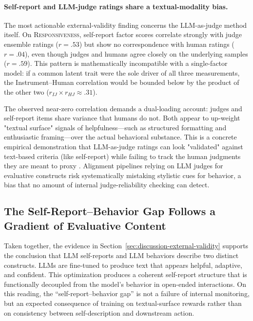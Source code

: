\documentclass[11pt]{article}
\newcommand{\factorname}[1]{\textsc{#1}}
\begin{document}
\paragraph{Self-report and LLM-judge ratings share a textual-modality bias.}
The most actionable external-validity finding concerns the LLM-as-judge method itself. On \factorname{Responsiveness}, self-report factor scores correlate strongly with judge ensemble ratings ($r = .53$) but show no correspondence with human ratings ($r = .04$), even though judges and humans agree closely on the underlying samples ($r = .59$). This pattern is mathematically incompatible with a single-factor model: if a common latent trait were the sole driver of all three measurements, the Instrument--Human correlation would be bounded below by the product of the other two ($r_{IJ} \times r_{HJ} \approx .31$). 

The observed near-zero correlation demands a dual-loading account: judges and self-report items share variance that humans do not. Both appear to up-weight "textual surface" signals of helpfulness---such as structured formatting and enthusiastic framing---over the actual behavioral substance. This is a concrete empirical demonstration that LLM-as-judge ratings can look "validated" against text-based criteria (like self-report) while failing to track the human judgments they are meant to proxy \citep{zheng2023judging}. Alignment pipelines relying on LLM judges for evaluative constructs risk systematically mistaking stylistic cues for behavior, a bias that no amount of internal judge-reliability checking can detect.

\subsection{The Self-Report--Behavior Gap Follows a Gradient of Evaluative Content}
\label{sec:discussion-self-insight}

Taken together, the evidence in Section~\ref{sec:discussion-external-validity} supports the conclusion that LLM self-reports and LLM behaviors describe two distinct constructs. LLMs are fine-tuned to produce text that appears helpful, adaptive, and confident. This optimization produces a coherent self-report structure that is functionally decoupled from the model's behavior in open-ended interactions. On this reading, the ``self-report--behavior gap'' is not a failure of internal monitoring, but an expected consequence of training on textual-surface rewards rather than on consistency between self-description and downstream action.
\end{document}
